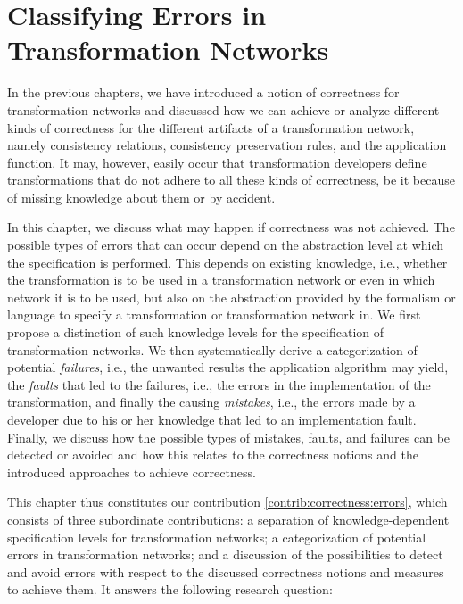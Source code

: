 \chapter{Classifying Errors in Transformation Networks 
}
\label{chap:errors}

In the previous chapters, we have introduced a notion of correctness for transformation networks and discussed how we can achieve or analyze different kinds of correctness for the different artifacts of a transformation network, namely consistency relations, consistency preservation rules, and the application function.
It may, however, easily occur that transformation developers define transformations that do not adhere to all these kinds of correctness, be it because of missing knowledge about them or by accident.

In this chapter, we discuss what may happen if correctness was not achieved.
The possible types of errors that can occur depend on the abstraction level at which the specification is performed. 
This depends on existing knowledge, i.e., whether the transformation is to be used in a transformation network or even in which network it is to be used, but also on the abstraction provided by the formalism or language to specify a transformation or transformation network in.
We first propose a distinction of such knowledge levels for the specification of transformation networks.
We then systematically derive a categorization of potential \emph{failures}, i.e., the unwanted results the application algorithm may yield, the \emph{faults} that led to the failures, i.e., the errors in the implementation of the transformation, and finally the causing \emph{mistakes}, i.e., the errors made by a developer due to his or her knowledge that led to an implementation fault.
Finally, we discuss how the possible types of mistakes, faults, and failures can be detected or avoided and how this relates to the correctness notions and the introduced approaches to achieve correctness.

This chapter thus constitutes our contribution \autoref{contrib:correctness:errors}, which consists of three subordinate contributions: a separation of knowledge-dependent specification levels for transformation networks; a categorization of potential errors in transformation networks; and a discussion of the possibilities to detect and avoid errors with respect to the discussed correctness notions and measures to achieve them.
It answers the following research question:

